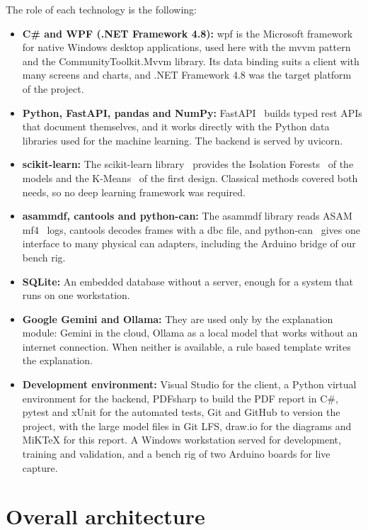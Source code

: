 The role of each technology is the following:

\begin{itemize}
    \item \textbf{C\# and WPF (.NET Framework 4.8):} \gls{wpf} is the Microsoft framework for native Windows desktop applications, used here with the \gls{mvvm} pattern and the CommunityToolkit.Mvvm library. Its data binding suits a client with many screens and charts, and .NET Framework 4.8 was the target platform of the project.
    \item \textbf{Python, FastAPI, pandas and NumPy:} FastAPI~\cite{fastapi} builds typed \gls{rest} APIs that document themselves, and it works directly with the Python data libraries used for the machine learning. The backend is served by uvicorn.
    \item \textbf{scikit-learn:} The scikit-learn library~\cite{pedregosa2011scikit} provides the Isolation Forests~\cite{liu2008isolation} of the models and the K-Means~\cite{macqueen1967methods} of the first design. Classical methods covered both needs, so no deep learning framework was required.
    \item \textbf{asammdf, cantools and python-can:} The asammdf library reads ASAM \gls{mf4}~\cite{asam_mdf} logs, cantools decodes frames with a \gls{dbc} file, and python-can~\cite{pythoncan} gives one interface to many physical \gls{can} adapters, including the Arduino bridge of our bench rig.
    \item \textbf{SQLite:} An embedded database without a server, enough for a system that runs on one workstation.
    \item \textbf{Google Gemini and Ollama:} They are used only by the explanation module: Gemini in the cloud, Ollama as a local model that works without an internet connection. When neither is available, a rule based template writes the explanation.
    \item \textbf{Development environment:} Visual Studio for the client, a Python virtual environment for the backend, PDFsharp to build the PDF report in C\#, pytest and xUnit for the automated tests, Git and GitHub to version the project, with the large model files in Git LFS, draw.io for the diagrams and MiKTeX for this report. A Windows workstation served for development, training and validation, and a bench rig of two Arduino boards for live capture.
\end{itemize}

\Needspace{657pt}%
\section{Overall architecture}
\label{sec:architecture}


